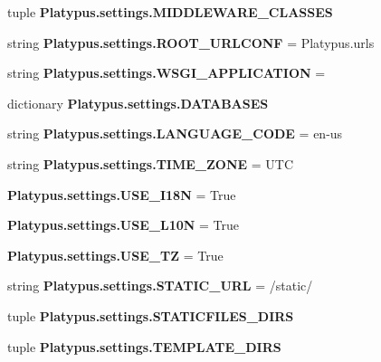 \begin{DoxyCompactItemize}
\item 
tuple {\bf Platypus.\+settings.\+M\+I\+D\+D\+L\+E\+W\+A\+R\+E\+\_\+\+C\+L\+A\+S\+S\+E\+S}
\item 
string {\bf Platypus.\+settings.\+R\+O\+O\+T\+\_\+\+U\+R\+L\+C\+O\+N\+F} = \textquotesingle{}Platypus.\+urls\textquotesingle{}
\item 
string {\bf Platypus.\+settings.\+W\+S\+G\+I\+\_\+\+A\+P\+P\+L\+I\+C\+A\+T\+I\+O\+N} = \textquotesingle{}
\item 
dictionary {\bf Platypus.\+settings.\+D\+A\+T\+A\+B\+A\+S\+E\+S}
\item 
string {\bf Platypus.\+settings.\+L\+A\+N\+G\+U\+A\+G\+E\+\_\+\+C\+O\+D\+E} = \textquotesingle{}en-\/us\textquotesingle{}
\item 
string {\bf Platypus.\+settings.\+T\+I\+M\+E\+\_\+\+Z\+O\+N\+E} = \textquotesingle{}U\+T\+C\textquotesingle{}
\item 
{\bf Platypus.\+settings.\+U\+S\+E\+\_\+\+I18\+N} = True
\item 
{\bf Platypus.\+settings.\+U\+S\+E\+\_\+\+L10\+N} = True
\item 
{\bf Platypus.\+settings.\+U\+S\+E\+\_\+\+T\+Z} = True
\item 
string {\bf Platypus.\+settings.\+S\+T\+A\+T\+I\+C\+\_\+\+U\+R\+L} = \textquotesingle{}/static/\textquotesingle{}
\item 
tuple {\bf Platypus.\+settings.\+S\+T\+A\+T\+I\+C\+F\+I\+L\+E\+S\+\_\+\+D\+I\+R\+S}
\item 
tuple {\bf Platypus.\+settings.\+T\+E\+M\+P\+L\+A\+T\+E\+\_\+\+D\+I\+R\+S}
\end{DoxyCompactItemize}
